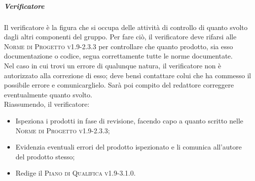 \subparagraph{Verificatore}
Il verificatore è la figura che si occupa delle attività di controllo di quanto svolto dagli altri componenti del gruppo. Per fare ciò, il verificatore deve rifarsi alle \textsc{Norme di Progetto v1.9-2.3.3} per controllare che quanto prodotto, sia esso documentazione o codice, segua correttamente tutte le norme documentate. \\
Nel caso in cui trovi un errore di qualunque natura, il verificatore non è autorizzato alla correzione di esso; deve bensì contattare colui che ha commesso il possibile errore e comunicarglielo. Sarà poi compito del redattore correggere eventualmente quanto svolto. \\
Riassumendo, il verificatore:
\begin{itemize}
  \item Ispeziona i prodotti in fase di revisione, facendo capo a quanto scritto nelle \textsc{Norme di Progetto v1.9-2.3.3};
  \item Evidenzia eventuali errori del prodotto ispezionato e li comunica all'autore del prodotto stesso;
  \item Redige il \textsc{Piano di Qualifica v1.9-3.1.0}.
\end{itemize}

